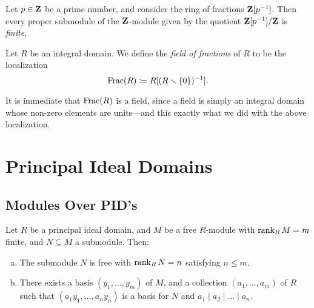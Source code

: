 \begin{example}
\label{exp:Z[1/p]/Z-finite-submodules}
Let \(p \in \mathbf{Z}\) be a prime number, and consider the ring of fractions
\(\mathbf{Z}[p^{-1}]\). Then every proper submodule of the \(\mathbf{Z}\)-module given by the
quotient \(\mathbf{Z}[p^{-1}]/\mathbf{Z}\) is \emph{finite}.
\end{example}

\begin{definition}
\label{def:field-of-fractions}
Let \(R\) be an integral domain. We define the \emph{field of fractions} of
\(R\) to be the localization
\[
\operatorname{Frac}(R) \coloneq R[(R \smallsetminus \{0\})^{-1}].
\]
\end{definition}

It is immediate that \(\operatorname{Frac}(R)\) is a field, since a field is simply an
integral domain whose non-zero elements are units---and this exactly what we did
with the above localization.

\section{Principal Ideal Domains}

\subsection{Modules Over PID's}

\begin{theorem}
\label{thm:module-over-PID}
Let \(R\) be a principal ideal domain, and \(M\) be a free \(R\)-module with
\(\operatorname{rank}_R M = m\) finite, and \(N \subseteq M\) a submodule. Then:
\begin{enumerate}[(a)]\setlength\itemsep{0em}
\item The submodule \(N\) is free with \(\operatorname{rank}_R N = n\) satisfying \(n \leq m\).
\item There exists a basis \((y_1, \dots, y_m)\) of \(M\), and a collection
  \((a_1, \dots, a_m)\) of \(R\) such that \((a_1 y_1, \dots, a_n y_n)\) is a
  basis for \(N\) and \(a_1 \mid a_2 \mid \dots \mid a_n\).
\end{enumerate}
\end{theorem}

